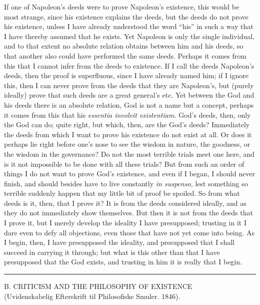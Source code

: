 \documentclass[12pt,a4paper,openany]{book}
\newcommand{\opage}[1]{\marginnote{\footnotesize\textit{[#1]}}}
\newcommand{\excerpthead}[1]{\par\bigskip\begin{center}#1\end{center}\nopagebreak\smallskip}
\newcommand{\sectionrule}{\par\begin{center}\rule{4em}{0.4pt}\end{center}}
\begin{document}
If one of Napoleon's deeds were to prove Napoleon's existence, this would be most
strange, since his existence explains the deeds, but the deeds do not prove his
existence, unless I have already understood the word ``his'' in such a way that I have
thereby assumed that he exists. Yet Napoleon is only the single individual, and to
that extent no absolute relation obtains between him and his deeds, so that another
also could have performed the same deeds. Perhaps it comes from this that I cannot
infer from the deeds to existence. If I call the deeds Napoleon's deeds, then the proof
is superfluous, since I have already named him; if I ignore this, then I can
\setcounter{footnote}{0}%
\opage{167}never prove from the deeds that they are Napoleon's, but (purely ideally) prove
that such deeds are a great general's etc. Yet between the God and his deeds there is
an absolute relation, God is not a name but a concept, perhaps it comes from this that
his \textit{essentia involvit existentiam.} God's deeds, then, only the God can do;
quite right, but which, then, are the God's deeds? Immediately the deeds from which I
want to prove his existence do not exist at all. Or does it perhaps lie right before
one's nose to see the wisdom in nature, the goodness, or the wisdom in the governance?
Do not the most terrible trials meet one here, and is it not impossible to be done
with all these trials? But from such an order of things I do not want to prove God's
existence, and even if I began, I should never finish, and should besides have to live
constantly \textit{in suspenso,} lest something so terrible suddenly happen that my
little bit of proof be spoiled. So from what deeds is it, then, that I prove it? It is
from the deeds considered ideally, and as they do not immediately show themselves. But
then it is not from the deeds that I prove it, but I merely develop the ideality I
have presupposed; trusting in it I dare even to defy all objections, even those that
have not yet come into being. As I begin, then, I have presupposed the ideality, and
presupposed that I shall succeed in carrying it through; but what is this other than
that I have presupposed that the God exists, and trusting in him it is really that I
begin.

\sectionrule

\excerpthead{B. CRITICISM AND THE PHILOSOPHY OF EXISTENCE \\ (Uvidenskabelig Efterskrift til Philosofiske Smuler. 1846).}
\end{document}
